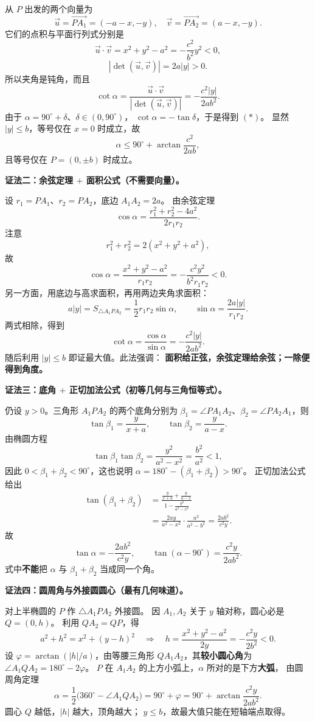 \begin{proofbox}
从 $P$ 出发的两个向量为
\[
\vec u=\overrightarrow{PA_1}=(-a-x,-y),\quad
\vec v=\overrightarrow{PA_2}=(a-x,-y).
\]
它们的点积与平面行列式分别是
\[
\vec u\cdot\vec v=x^2+y^2-a^2
=-\frac{c^2}{b^2}y^2<0,
\]
\[
|\det(\vec u,\vec v)|=2a|y|>0.
\]
所以夹角是钝角，而且
\[
\cot\alpha=\frac{\vec u\cdot\vec v}
{|\det(\vec u,\vec v)|}
=-\frac{c^2|y|}{2ab^2}.
\]
由于 $\alpha=90^\circ+\delta$、$\delta\in(0,90^\circ)$，
$\cot\alpha=-\tan\delta$，于是得到 $(*)$。
显然 $|y|\le b$，等号仅在 $x=0$ 时成立，故
\[
\alpha\le90^\circ+\arctan\frac{c^2}{2ab},
\]
且等号仅在 $P=(0,\pm b)$ 时成立。

\medskip
\textbf{证法二：余弦定理 $+$ 面积公式（不需要向量）。}

设 $r_1=PA_1$、$r_2=PA_2$，底边 $A_1A_2=2a$。
由余弦定理
\[
\cos\alpha=\frac{r_1^2+r_2^2-4a^2}{2r_1r_2}.
\]
注意
\[
r_1^2+r_2^2=2(x^2+y^2+a^2),
\]
故
\[
\cos\alpha=\frac{x^2+y^2-a^2}{r_1r_2}
=-\frac{c^2y^2}{b^2r_1r_2}<0.
\]
另一方面，用底边与高求面积，再用两边夹角求面积：
\[
a|y|=S_{\triangle A_1PA_2}
=\frac12r_1r_2\sin\alpha,
\qquad \sin\alpha=\frac{2a|y|}{r_1r_2}.
\]
两式相除，得到
\[
\cot\alpha=\frac{\cos\alpha}{\sin\alpha}
=-\frac{c^2|y|}{2ab^2}.
\]
随后利用 $|y|\le b$ 即证最大值。此法强调：
\textbf{面积给正弦，余弦定理给余弦；一除便得到角度。}

\medskip
\textbf{证法三：底角 $+$ 正切加法公式（初等几何与三角恒等式）。}

仍设 $y>0$。三角形 $A_1PA_2$ 的两个底角分别为
$\beta_1=\angle PA_1A_2$、$\beta_2=\angle PA_2A_1$，则
\[
\tan\beta_1=\frac{y}{x+a},\qquad
\tan\beta_2=\frac{y}{a-x}.
\]
由椭圆方程
\[
\tan\beta_1\tan\beta_2
=\frac{y^2}{a^2-x^2}=\frac{b^2}{a^2}<1,
\]
因此 $0<\beta_1+\beta_2<90^\circ$，这也说明
$\alpha=180^\circ-(\beta_1+\beta_2)>90^\circ$。
正切加法公式给出
\begin{align*}
\tan(\beta_1+\beta_2)
&=\frac{\frac{y}{x+a}+\frac{y}{a-x}}
{1-\frac{y^2}{a^2-x^2}}\\
&=\frac{2ay}{a^2-x^2}\cdot\frac{a^2}{a^2-b^2}
=\frac{2ab^2}{c^2y}.
\end{align*}
故
\[
\tan\alpha=-\frac{2ab^2}{c^2y},\qquad
\tan(\alpha-90^\circ)=\frac{c^2y}{2ab^2}.
\]
式中\textbf{不能}把 $\alpha$ 与 $\beta_1+\beta_2$ 当成同一个角。

\medskip
\textbf{证法四：圆周角与外接圆圆心（最有几何味道）。}

对上半椭圆的 $P$ 作 $\triangle A_1PA_2$ 外接圆。
因 $A_1,A_2$ 关于 $y$ 轴对称，圆心必是 $Q=(0,h)$。
利用 $QA_2=QP$，得
\[
a^2+h^2=x^2+(y-h)^2
\quad\Longrightarrow\quad
h=\frac{x^2+y^2-a^2}{2y}
=-\frac{c^2y}{2b^2}<0.
\]
设 $\varphi=\arctan(|h|/a)$，由等腰三角形
$QA_1A_2$，其\textbf{较小圆心角}为
$\angle A_1QA_2=180^\circ-2\varphi$。
$P$ 在 $A_1A_2$ 的上方小弧上，$\alpha$ 所对的是下方\textbf{大弧}，
由圆周角定理
\[
\alpha=\frac12\bigl(360^\circ-\angle A_1QA_2\bigr)
=90^\circ+\varphi
=90^\circ+\arctan\frac{c^2y}{2ab^2}.
\]
圆心 $Q$ 越低，$|h|$ 越大，顶角越大；
$y\le b$，故最大值只能在短轴端点取得。


\end{proofbox}
